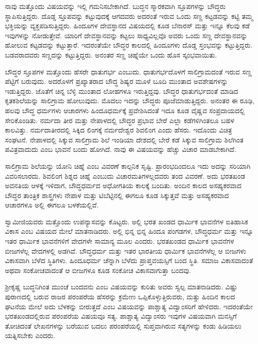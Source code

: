  ನಾವು ಮತ್ತೊಂದು ವಿಷಯವನ್ನು ಇಲ್ಲಿ ಗಮನಿಸಬೇಕಾಗಿದೆ. ಬುದ್ಧನ ಸ್ಮಾರಕವಾಗಿ ಸ್ತೂಪಗಳನ್ನು ಬೌದ್ಧರು ಸ್ಥಾಪಿಸುತ್ತಿದ್ದರು. ದೊಡ್ಡ ಸ್ತೂಪವನ್ನು ಕಟ್ಟುವುದಕ್ಕೆ ಆಗದವರು ಅದರಂತೆ ಇರುವ ಒಂದು ಸಣ್ಣ ಕಟ್ಟಡವನ್ನು ಕಟ್ಟಿ ತಮ್ಮ ಭಕ್ತಿಯನ್ನು ವ್ಯಕ್ತಪಡಿಸುತ್ತಿದ್ದರು. ಹಿಂದೂಗಳ ದೇವಸ್ಥಾನದ ವಿಷಯದಲ್ಲಿ ಕೂಡ ಬೆನಾರಸ್ ಮತ್ತು ಇನ್ನೂ ಕೆಲವು ಕಡೆ ಇವುಗಳನ್ನು ನೋಡುತ್ತೇವೆ. ಯಾರಿಗೆ ದೇವಸ್ಥಾನವನ್ನು ಕಟ್ಟಲು ಸಾಧ್ಯವಿಲ್ಲವೊ ಅವರು ಒಂದು ಸಣ್ಣ ದೇವಸ್ಥಾನವನ್ನು ಹೋಲುವ ಕಟ್ಟಡವನ್ನು ಕಟ್ಟುತ್ತಾರೆ. ಇದರಂತೆಯೇ ಬೌದ್ಧರ ಕಾಲದಲ್ಲಿ ಹಿಂದೂಗಳು ದೊಡ್ಡ ಸ್ತಂಭವನ್ನು ಕಟ್ಟುತ್ತಿದ್ದರು. ಬಡವರಾದವರು ಸಣ್ಣದನ್ನು ಕಟ್ಟುತ್ತಿದ್ದರು. ಅನಂತರ ಸಣ್ಣ ಚಿಹ್ನೆಯೇ ಒಂದು ಹೊಸ ಸ್ಕಂಭವಾಯಿತು. 

 ಬೌದ್ಧರ ಸ್ತೂಪಗಳ ಮತ್ತೊಂದು ಹೆಸರೇ ಧಾತುಗರ್ಭ ಎಂಬುದು. ಧಾತುಗರ್ಭದೊಳಗೆ ಸಾಲಿಗ್ರಾಮದಂತೆ ಇರುವ ಸಣ್ಣ ಪೆಟ್ಟಿಗೆ ಬರುವುದು. ಅದರೊಳಗೆ ಪ್ರಖ್ಯಾತರಾದ ಬೌದ್ಧ ಶಿಷ್ಯರ ಮೂಳೆ ಬೂದಿ ಮುಂತಾದ ಅವಶೇಷಗಳನ್ನು ಇಡುತ್ತಿದ್ದರು. ಜೊತೆಗೆ ಚಿನ್ನ ಬೆಳ್ಳಿ ಮುಂತಾದ ಲೋಹಗಳೂ ಇರುತ್ತಿದ್ದವು. ಬೌದ್ಧರ ಧಾತುಗರ್ಭದಂತೆ ಮಾಡಿದ ಕೃತಕಶಿಲೆಯನ್ನು ಸಾಲಿಗ್ರಾಮ ಹೋಲುವುದು. ಮೊದಲು ಇದನ್ನು ಬೌದ್ಧರು ಪೂಜೆಮಾಡುತ್ತಿದ್ದರು. ಅನಂತರ ಈ ರೂಢಿ, ಹಲವು ಬೌದ್ಧ ಧರ್ಮಗಳು ಆಚಾರಗಳು ಹಿಂದೂಧರ್ಮಕ್ಕೆ ಪ್ರವೇಶಿಸಿದಂತೆ ಇದೂ ಕೂಡ ವೈಷ್ಣವ ಸಂಪ್ರದಾಯದಲ್ಲಿ ಸೇರಿಕೊಂಡಿತು. ನರ್ಮದಾ ತೀರ ಮತ್ತು ನೇಪಾಳದಲ್ಲಿ ಬೌದ್ಧರ ಪ್ರಭಾವ ಬೇರೆ ಎಲ್ಲಾ ಕಡೆಗಳಿಗಿಂತಲೂ ಬಹಳ ಕಾಲವಿತ್ತು. ನರ್ಮದಾತೀರದಲ್ಲಿ ಸಿಕ್ಕಿದ ಲಿಂಗಕ್ಕೆ ನರ್ಮದೇಶ್ವರ ಶಿವಲಿಂಗ ಎಂದು ಹೆಸರು. ಇದೊಂದು ವಿಚಿತ್ರ ಸಂಘಟನೆ. ನೇಪಾಳದಲ್ಲಿ ಸಿಕ್ಕುವ ಸಾಲಿಗ್ರಾಮ ಶಿಲೆ ಇಂಡಿಯಾ ದೇಶದಲ್ಲಿ ಬೇರೆ ಕಡೆ ಸಿಕ್ಕುವ ಸಾಲಿಗ್ರಾಮ ಶಿಲೆಗಿಂತ ಪವಿತ್ರವಾದುದು ಎಂಬ ಭಾವನೆ ಬಂದು ಹೋಗಿದೆ. ನಾವು ಈ ವಿಷಯವನ್ನು ಹೆಚ್ಚು ವಿಚಾರ ಮಾಡಬೇಕಾಗಿದೆ. 

 ಸಾಲಿಗ್ರಾಮ ಶಿಲೆಯನ್ನು ಯೋನಿ ಚಿಹ್ನೆ ಎಂಬ ವಿವರಣೆ ಕಾಲ್ಪನಿಕ ಸೃಷ್ಟಿ. ಪ್ರಾರಂಭದಿಂದಲೂ ಇದು ಅದನ್ನು ಸರಿಯಾಗಿ ವಿವರಿಸಲಾರದು. ಶಿವಲಿಂಗ ಶಿಶ್ನದ ಚಿಹ್ನೆ ಎಂಬುದು ವಿಚಾರಮತಿಗಳಲ್ಲದವರು ತಂದ ವಿವರಣೆ. ಅದು ಭರತಖಂಡ ಅವನತಿಯ ಆಳಕ್ಕೆ ಇಳಿದಾಗ, ಬೌದ್ಧಧರ್ಮದ ಅಧೋಗತಿಯ ಕಾಲಕ್ಕೆ ಬಂದಿತು. ಅಂದಿನ ಕಾಲದ ಅಸಹ್ಯಕರವಾದ ಬೌದ್ಧರ ತಾಂತ್ರಿಕ ಶಾಸ್ತ್ರಗಳು ನೇಪಾಳ ಮತ್ತು ಟಿಬೆಟ್ಟಿನಲ್ಲಿ ಈಗಲೂ ಕೂಡ ಸಿಕ್ಕುತ್ತವೆ ಮತ್ತು ಅಸಹ್ಯಕರವಾದ ಆಚಾರಗಳೂ ಅಲ್ಲಿ ಈಗಲೂ ಬಳಕೆಯಲ್ಲಿವೆ. 

 ಸ್ವಾಮೀಜಿಯವರು ಮತ್ತೊಂದು ಉಪನ್ಯಾಸವನ್ನು ಕೊಟ್ಟರು. ಅಲ್ಲಿ ಭರತ ಖಂಡದ ಧಾರ್ಮಿಕ ಭಾವನೆಗಳ ಐತಿಹಾಸಿಕ ವಿಕಾಸ ಎಂಬ ವಿಷಯದ ಮೇಲೆ ಮಾತನಾಡಿದರು. ಅಲ್ಲಿ ಭಿನ್ನ ಭಿನ್ನ ಹಿಂದೂ ಪಂಗಡಗಳ, ಬೌದ್ಧಧರ್ಮ ಮತ್ತು ಇನ್ನೂ ಇತರ ಧಾರ್ಮಿಕ ಭಾವನೆಗಳಿಗೆ ವೇದಗಳೇ ಸಾಮಾನ್ಯ ಮೂಲ ಎಂದರು. ಭರತಖಂಡದ ಧಾರ್ಮಿಕ ಭಾವನೆಗಳ ಬೀಜಗಳೆಲ್ಲ ವೇದಗಳಲ್ಲಿ ಅಡಗಿವೆ. ಬೌದ್ಧಧರ್ಮ ಮತ್ತು ಇತರ ಭಾರತೀಯ ಧಾರ್ಮಿಕ ಭಾವನೆಗಳೆಲ್ಲ ಆ ಬೀಜಗಳು ವಿಕಾಸವಾಗಿ ಬೆಳೆದ ಸ್ಥಿತಿಗಳು. ಹಿಂದೂಧರ್ಮ ಚೆನ್ನಾಗಿ ಬೆಳೆದು ಪ್ರಾಪ್ತವಯಸ್ಸಿಗೆ ಬಂದ ಸ್ಥಿತಿ. ಸಮಾಜ ವಿಕಾಸವಾದಂತೆ ಅಥವಾ ಸಂಕೋಚವಾದಂತೆ ಆ ಬೀಜಗಳೂ ಕೂಡ ಸಂಕೋಚ ವಿಕಾಸವಾಗುತ್ತಾ ಬಂದವು. 

 ಶ‍್ರೀಕೃಷ್ಣ ಬುದ್ಧನಿಗಿಂತ ಮುಂಚೆ ಬಂದವನು ಎಂಬ ವಿಷಯವನ್ನು ಕುರಿತು ಅವರು ಸ್ವಲ್ಪ ಮಾತನಾಡಿದರು. ವಿಷ್ಣು ಪುರಾಣದಲ್ಲಿ ಬರುವ ರಾಜರ ಪರಂಪರೆಯ ಹೆಸರನ್ನು ಕ್ರಮೇಣ ಒಪ್ಪಿಕೊಳ್ಳುತ್ತಿರುವರು, ಮತ್ತು ಹಿಂದಿನ ಕಾಲದ ಘಟನೆಯ ಮೇಲೆ ಅದು ಬೆಳಕನ್ನು ಬೀರುತ್ತದೆ ಎಂಬ ವಿಷಯವನ್ನು ಪಾಶ್ಚಾತ್ಯ ವಿದ್ವಾಂಸರಿಗೆ ಹೇಳಿದರು. ಇದರಂತೆಯೇ ಭರತಖಂಡದಲ್ಲಿರುವ ಪರಂಪರೆಯ ವಿಷಯವೂ ಸತ್ಯ. ಪಾಶ್ಚಾತ್ಯ ವಿದ್ವಾಂಸರು ಇವುಗಳ ವಿಷಯವಾಗಿ ಮನಸ್ಸಿಗೆ ತೋಚಿದಂತೆ ಲೇಖನಗಳನ್ನು ಬರೆಯುವ ಬದಲು ಪರಂಪರೆಯಲ್ಲಿ ಸುಪ್ತವಾಗಿರುವ ಸತ್ಯಗಳನ್ನು ಕಂಡು ಹಿಡಿಯಲು ಯತ್ನಿಸಬೇಕು ಎಂದರು. 

